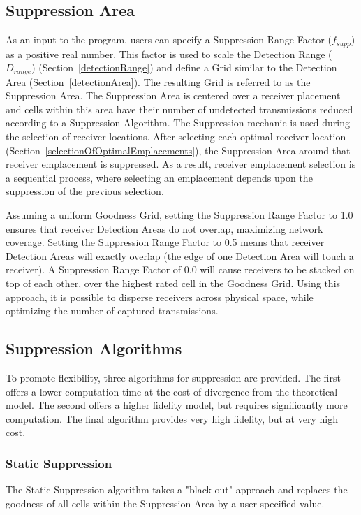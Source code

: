 \subsection{Suppression Area}
As an input to the program, users can specify a Suppression Range Factor ($f_{supp}$) as a positive real number.  This factor is used to scale the Detection Range ($D_{range}$) (Section~\ref{detectionRange}) and define a Grid similar to the Detection Area (Section~\ref{detectionArea}).  The resulting Grid is referred to as the Suppression Area.  The Suppression Area is centered over a receiver placement and cells within this area have their number of undetected transmissions reduced according to a Suppression Algorithm.  The Suppression mechanic is used during the selection of receiver locations.  After selecting each optimal receiver location (Section~\ref{selectionOfOptimalEmplacements}), the Suppression Area around that receiver emplacement is suppressed.  As a result, receiver emplacement selection is a sequential process, where selecting an emplacement depends upon the suppression of the previous selection.  

Assuming a uniform Goodness Grid, setting the Suppression Range Factor to 1.0 ensures  that receiver Detection Areas do not overlap, maximizing network coverage.  Setting the Suppression Range Factor to 0.5 means that receiver Detection Areas will exactly overlap (the edge of one Detection Area will touch a receiver).  A Suppression Range Factor of 0.0 will cause receivers to be stacked on top of each other, over the highest rated cell in the Goodness Grid.  Using this approach, it is possible to disperse receivers across physical space, while optimizing the number of captured transmissions.

\subsection{Suppression Algorithms}
\label{suppressionAlgorithms}
To promote flexibility, three algorithms for suppression are provided.  The first offers a lower computation time at the cost of divergence from the theoretical model.  The second offers a higher fidelity model, but requires significantly more computation.  The final algorithm provides very high fidelity, but at very high cost.

\subsubsection{Static Suppression}
\label{staticSuppression}
The Static Suppression algorithm takes a "black-out" approach and replaces the goodness of all cells within the Suppression Area by a user-specified value.



